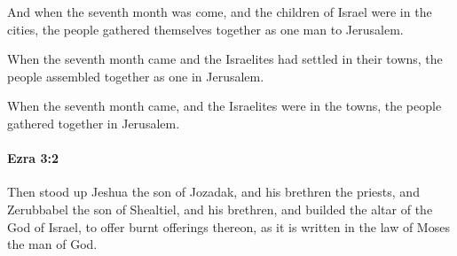 			\begin{versebox}
					\item[BHS] 
					\item[LXX] 
					\item[ASV] And when the seventh month was come, and the children of Israel were in the cities, the people gathered themselves together as one man to Jerusalem.
					\item[NIV] When the seventh month came and the Israelites had settled in their towns, the people assembled together as one in Jerusalem.
					\item[NRSV] When the seventh month came, and the Israelites were in the towns, the people gathered together in Jerusalem.
			\end{versebox}

		\paragraph{Ezra 3:2} %
			\label{EZRA-3-2}

			Then stood up Jeshua the son of Jozadak, and his brethren the priests, and Zerubbabel the son of Shealtiel, and his brethren, and builded the altar of the God of Israel, to offer burnt offerings thereon, as it is written in the law of Moses the man of God.

